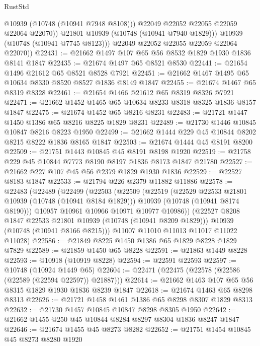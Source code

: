 \begin{lexlean}{RustStd}
\begin{coremodule}
                  @10939
                  (@10748 (@10941 @7948 @8108)))
                @22049
                @22052
                @22055
                @22059
                @22064
                @22070))
            @21801
            @10939
            (@10748 (@10941 @7940 @1829)))
          @10939
          (@10748 (@10941 @7745 @8123)))
        @22049
        @22052
        @22055
        @22059
        @22064
        @22070))
@22431 := @21662 @1497 @107 @65 @56 @8532 @1829 @1930 @1836 @8141 @1847
@22435 := @21674 @1497 @65 @8521 @8530
@22441 := @21654 @1496 @21612 @65 @8521 @8528 @7921
@22451 := @21662 @1467 @1495 @65 @10634 @8330 @8520 @8527 @1836 @8149 @1847
@22455 := @21674 @1467 @65 @8319 @8328
@22461 := @21654 @1466 @21612 @65 @8319 @8326 @7921
@22471 := @21662 @1452 @1465 @65 @10634 @8233 @8318 @8325 @1836 @8157 @1847
@22475 := @21674 @1452 @65 @8216 @8231
@22483 := @21721 @1447 @1450 @1386 @65 @8216 @8225 @1829 @8231
@22489 := @21730 @1446 @10845 @10847 @8216 @8223 @1950
@22499 := @21662 @1444 @229 @45 @10844 @8202 @8215 @8222 @1836 @8165 @1847
@22503 := @21674 @1444 @45 @8191 @8200
@22509 := @21751 @1443 @10845 @45 @8191 @8198 @1920
@22519 := @21758 @229 @45 @10844 @7773 @8190 @8197 @1836 @8173 @1847 @21780
@22527 := @21662 @227 @107 @45 @56 @2379 @1829 @1930 @1836
@22529 := @22527 @8183 @1847
@22533 := @21794 @226 @2379 @11882 @11886
@22578 := @22483
    (@22489
      (@22499
        (@22503
          (@22509
            (@22519
              (@22529 @22533 @21801 @10939 (@10748 (@10941 @8184 @1829)))
              @10939
              (@10748 (@10941 @8174 @8190)))
            @10957
            @10961
            @10966
            @10971
            @10977
            @10986))
        (@22527 @8208 @1847 @22533 @21801 @10939 (@10748 (@10941 @8209 @1829)))
        @10939
        (@10748 (@10941 @8166 @8215)))
      @11007
      @11010
      @11013
      @11017
      @11022
      @11028)
@22586 := @21849 @8225 @1450 @1386 @65 @1829 @8228 @1829 @7829
@22589 := @21859 @1450 @65 @8228
@22591 := @21863 @1449 @8228
@22593 := @10918 (@10919 @8228)
@22594 := @22591 @22593
@22597 := @10748 (@10924 @1449 @65)
@22604 := @22471 (@22475 (@22578 (@22586 (@22589 (@22594 @22597)) @21887)))
@22614 := @21662 @1463 @107 @65 @56 @8315 @1829 @1930 @1836 @8239 @1847
@22618 := @21674 @1463 @65 @8298 @8313
@22626 := @21721 @1458 @1461 @1386 @65 @8298 @8307 @1829 @8313
@22632 := @21730 @1457 @10845 @10847 @8298 @8305 @1950
@22642 := @21662 @1455 @250 @45 @10844 @8284 @8297 @8304 @1836 @8247 @1847
@22646 := @21674 @1455 @45 @8273 @8282
@22652 := @21751 @1454 @10845 @45 @8273 @8280 @1920

\end{coremodule}
\end{lexlean}

